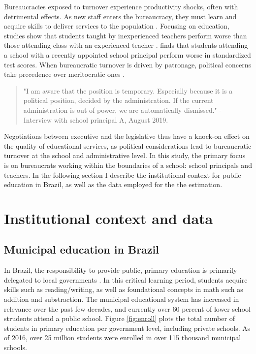 Bureaucracies exposed to turnover experience productivity shocks, often with detrimental effects. As new staff enters the bureaucracy, they must learn and acquire skills to deliver services to the population \citet{gailmard_slackers_2007}. Focusing on education, studies show that students taught by inexperienced teachers perform worse than those attending class with an experienced teacher \citet{clotfelter_teacher_2007}. \citet{akhtari_political_2015} finds that students attending a school with a recently appointed school principal perform worse in standardized test scores. When bureaucratic turnover is driven by patronage, political concerns take precedence over meritocratic ones \citet{colonnelli_patronage_2017}.

\begin{quote}
"I am aware that the position is temporary. Especially because it is a political position, decided by the administration. If the current administration is out of power, we are automatically dismissed." - Interview with school principal A, August 2019.
\end{quote}

Negotiations between executive and the legislative thus have a knock-on effect on the quality of educational services, as political considerations lead to bureaucratic turnover at the school and administrative level. In this study, the primary focus is on bureaucrats working within the boundaries of a school: school principals and teachers. In the following section I describe the institutional context for public education in Brazil, as well as the data employed for the the estimation.

\section{Institutional context and data}
\label{sec:context}

\subsection{Municipal education in Brazil}

In Brazil, the responsibility to provide public, primary education is primarily delegated to local governments \citet{paschoal_historia_2009}. In this critical learning period, students acquire skills such as reading/writing, as well as foundational concepts in math such as addition and substraction. The municipal educational system has increased in relevance over the past few decades, and currently over 60 percent of lower school strudents attend a public school. Figure \ref{fig:enroll} plots the total number of students in primary education per government level, including private schools. As of 2016, over 25 million students were enrolled in over 115 thousand municipal schools.

